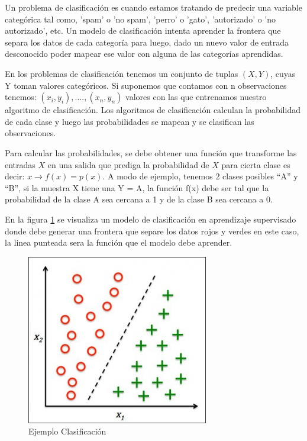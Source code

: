 Un problema de clasificación es cuando estamos tratando de predecir una variable categórica tal como, 'spam' o 'no spam', 'perro' o 'gato', 'autorizado' o 'no autorizado', etc. Un modelo de clasificación intenta aprender la frontera que separa los datos de cada categoría para luego, dado un nuevo valor de entrada desconocido poder mapear ese valor con alguna de las categorías aprendidas.

En los problemas de clasificación tenemos un conjunto de tuplas $(X,Y)$, cuyas Y toman valores categóricos. Si suponemos que contamos con n observaciones tenemos: $(x_i,y_i),....,(x_n,y_n)$ valores con las que entrenamos nuestro algoritmo de clasificación. Los algoritmos de clasificación  calculan la probabilidad de cada clase y luego las probabilidades se mapean y se clasifican las observaciones.

Para calcular las probabilidades, se debe obtener una función que transforme las entradas $X$ en una salida que prediga la probabilidad de $X$ para cierta clase es decir: $ x \longrightarrow f(x) = p(x) $. A modo de ejemplo,  tenemos 2 clases posibles “A” y “B”, si la muestra X tiene una Y = A, la función f(x) debe ser tal que la probabilidad de la clase A sea cercana a 1 y  de la clase B sea cercana a 0.

En la figura \ref{Fig:clasificacion} se visualiza un modelo de clasificación en aprendizaje supervisado donde debe generar una frontera que separe los datos rojos y verdes en este caso, la linea punteada sera la función que el modelo debe aprender. 

\begin{figure}[H] \centering
  \includegraphics[scale=0.4,keepaspectratio=true,clip=true]{imagenes/MarcoTeorico/classification.jpg}
  \caption{Ejemplo Clasificación}\label{Fig:clasificacion}
\end{figure}

